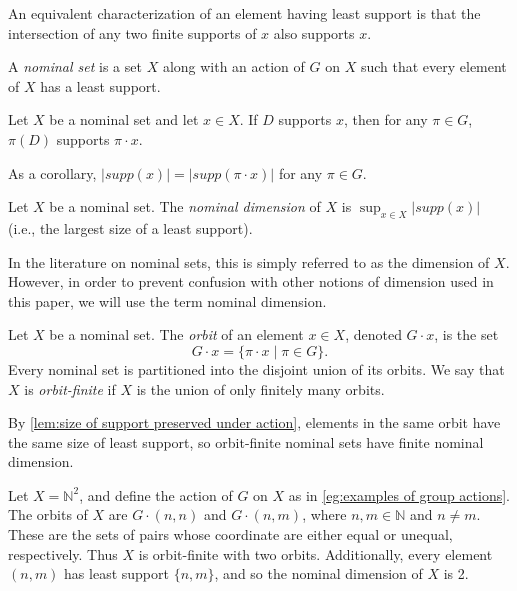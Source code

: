 \documentclass[runningheads]{llncs}
\newcommand{\bb}{\mathbb}
\begin{document}
An equivalent characterization of an element having least support is that the intersection of any two finite supports of $x$ also supports $x$.

\begin{definition}
    A \emph{nominal set} is a set $X$ along with an action of $G$ on $X$ such that every element of $X$ has a least support.
\end{definition}

\begin{lemma} \label{lem:size of support preserved under action}
    Let $X$ be a nominal set and let $x \in X$.
    If $D$ supports $x$, then for any $\pi \in G$, $\pi(D)$ supports $\pi \cdot x$.

    As a corollary, $|supp(x)| = |supp(\pi \cdot x)|$ for any $\pi \in G$.
\end{lemma}

\begin{definition}
    Let $X$ be a nominal set. 
    The \emph{nominal dimension} of $X$ is $\displaystyle \sup_{x \in X} |supp(x)|$ (i.e., the largest size of a least support).
\end{definition}


In the literature on nominal sets, this is simply referred to as the dimension of $X$. 
However, in order to prevent confusion with other notions of dimension used in this paper, we will use the term nominal dimension.

\begin{definition}
    Let $X$ be a nominal set.
    The \emph{orbit} of an element $x \in X$, denoted $G \cdot x$, is the set
    \[
    G \cdot x = \{\pi \cdot x \mid \pi \in G\}.
    \]
    Every nominal set is partitioned into the disjoint union of its orbits.
    We say that $X$ is \emph{orbit-finite} if $X$ is the union of only finitely many orbits. 
\end{definition}

By \autoref{lem:size of support preserved under action}, elements in the same orbit have the same size of least support, so orbit-finite nominal sets have finite nominal dimension.

\begin{example}
    Let $X = \bb N^2$, and define the action of $G$ on $X$ as in \autoref{eg:examples of group actions}.
    The orbits of $X$ are $G \cdot (n,n)$ and $G \cdot (n,m)$, where $n,m \in \bb N$ and $n \neq m$.
    These are the sets of pairs whose coordinate are either equal or unequal, respectively.
    Thus $X$ is orbit-finite with two orbits.
    Additionally, every element $(n,m)$ has least support $\{n,m\}$, and so the nominal dimension of $X$ is 2.
\end{example}
\end{document}
